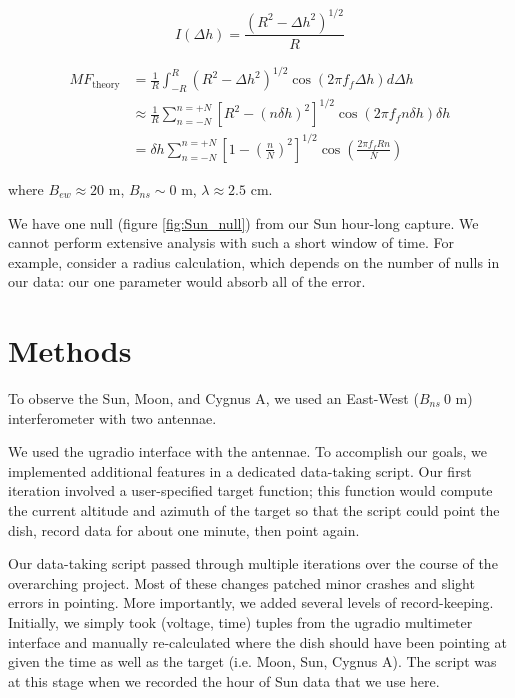 \documentclass[12pt]{article}
\begin{document}
\begin{equation}
I(\Delta h) = \frac{(R^2 - \Delta h^2)^{1/2}}{R}
\end{equation}

\begin{equation}
\begin{split}
MF_\text{theory} &= \frac{1}{R} \int_{-R}^R \left( R^2 - \Delta h^2 \right)^{1/2} \cos \left( 2 \pi f_f \Delta h \right) d \Delta h \\
&\approx \frac{1}{R} \sum_{n = -N}^{n = +N} \left[ R^2 - (n\delta h)^2 \right]^{1/2} \cos \left( 2 \pi f_f n \delta h \right) \delta h \\
&= \delta h \sum_{n = -N}^{n = +N} \left[ 1 - \left( \frac{n}{N} \right)^2 \right]^{1/2} \cos \left(\frac{2 \pi f_f R n}{N} \right)
\end{split}
\end{equation}

where $B_{ew} \approx 20$ m, $B_{ns} \sim 0$ m, $\lambda \approx 2.5$ cm.

We have one null (figure \ref{fig:Sun_null}) from our Sun hour-long capture. We cannot perform extensive analysis with such a short window of time. For example, consider a radius calculation, which depends on the number of nulls in our data: our one parameter would absorb all of the error.

\section{Methods}

\quad \quad To observe the Sun, Moon, and Cygnus A, we used an East-West ($B_{ns} ~ 0$ m) interferometer with two antennae.

We used the ugradio interface with the antennae. To accomplish our goals, we implemented additional features in a dedicated data-taking script. Our first iteration involved a user-specified target function; this function would compute the current altitude and azimuth of the target so that the script could point the dish, record data for about one minute, then point again.

Our data-taking script passed through multiple iterations over the course of the overarching project. Most of these changes patched minor crashes and slight errors in pointing. More importantly, we added several levels of record-keeping. Initially, we simply took (voltage, time) tuples from the ugradio multimeter interface and manually re-calculated where the dish should have been pointing at given the time as well as the target (i.e. Moon, Sun, Cygnus A). The script was at this stage when we recorded the hour of Sun data that we use here.
\end{document}
